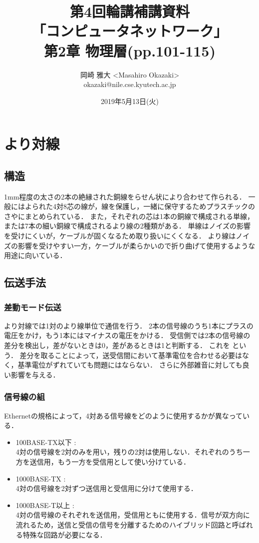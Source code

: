 \documentclass[a4paper]{ltjsarticle}
\title{第4回輪講補講資料 \\ 「コンピュータネットワーク」 \\ 第2章 物理層(pp.101-115)}
\author{岡崎 雅大 <Masahiro Okazaki> \\ okazaki@nile.cse.kyutech.ac.jp}
\date{2019年5月13日(火)}
\begin{document}
\maketitle
\tableofcontents

\section{より対線}\label{ux3088ux308aux5bfeux7dda}

\subsection{構造}\label{ux69cbux9020}

1mm程度の太さの2本の絶縁された銅線をらせん状により合わせて作られる．
一般にはよられた4対8芯の線が，線を保護し，一緒に保守するためプラスチックのさやにまとめられている．
また，それぞれの芯は1本の銅線で構成される単線，または7本の細い銅線で構成されるより線の2種類がある．
単線はノイズの影響を受けにくいが，ケーブルが固くなるため取り扱いにくくなる．
より線はノイズの影響を受けやすい一方，ケーブルが柔らかいので折り曲げて使用するような用途に向いている．

\subsection{伝送手法}\label{ux4f1dux9001ux624bux6cd5}

\subsubsection{差動モード伝送}\label{ux5deeux52d5ux30e2ux30fcux30c9ux4f1dux9001}

より対線では1対のより線単位で通信を行う．
2本の信号線のうち1本にプラスの電圧をかけ，もう1本にはマイナスの電圧をかける．
受信側では2本の信号線の差分を検出し，差がないときは0，差があるときは1と判断する．
これを  という．
差分を取ることによって，送受信間において基準電位を合わせる必要はなく，基準電位がずれていても問題にはならない．
さらに外部雑音に対しても良い影響を与える．

\subsubsection{信号線の組}\label{ux4fe1ux53f7ux7ddaux306eux7d44}

Ethernetの規格によって，4対ある信号線をどのように使用するかが異なっている．

\begin{itemize}
\item
  100BASE-TX以下 : \\
  4対の信号線を2対のみを用い，残りの2対は使用しない．それぞれのうち一方を送信用，もう一方を受信用として使い分けている．
\item
  1000BASE-TX : \\
  4対の信号線を2対ずつ送信用と受信用に分けて使用する．
\item
  1000BASE-T以上 : \\
  4対の信号線のそれぞれを送信用，受信用ともに使用する．信号が双方向に流れるため，送信と受信の信号を分離するためのハイブリッド回路と呼ばれる特殊な回路が必要になる．
\end{itemize}
\end{document}
